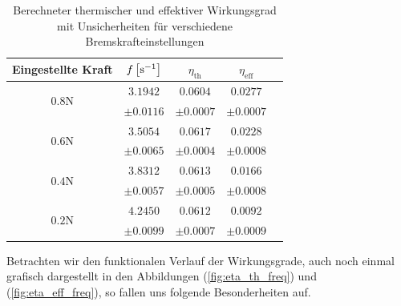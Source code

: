 \begin{table}[H]
  \centering
  \begin{tabular}{c c c c c}
  \toprule
  \textbf{Eingestellte Kraft} & \boldmath$f\,\qty[\si{\per\second}]$ & \boldmath$\eta_{\text{th}}$ & \boldmath$\eta_{\text{eff}}$ \\
  \midrule
  \multirow{2}{*}{\boldmath$0.8\si{\newton}$} & $3.1942$& $0.0604$ & $0.0277$ \\
   & $\pm 0.0116$ & $\pm 0.0007$ & $\pm 0.0007$ \\
  \midrule
  \multirow{2}{*}{\boldmath$0.6\si{\newton}$} & $3.5054$ & $0.0617$ & $0.0228$ \\
   & $\pm 0.0065$ & $\pm 0.0004$ & $\pm 0.0008$ \\
  \midrule
  \multirow{2}{*}{\boldmath$0.4\si{\newton}$} &  $3.8312$& $0.0613$ & $0.0166$ \\
   &  $\pm 0.0057$& $\pm 0.0005$ & $\pm 0.0008$ \\
  \midrule
  \multirow{2}{*}{\boldmath$0.2\si{\newton}$} &  $4.2450$& $0.0612$ & $0.0092$ \\
   &  $\pm 0.0099$ & $\pm 0.0007$ & $\pm 0.0009$ \\
  \bottomrule
  \end{tabular}
  \label{tab:werte_gebremst_kurz}
  \caption{Berechneter thermischer und effektiver Wirkungsgrad mit Unsicherheiten für verschiedene Bremskrafteinstellungen}
\end{table}
Betrachten wir den funktionalen Verlauf der Wirkungsgrade, auch noch einmal grafisch dargestellt in den Abbildungen (\ref{fig:eta_th_freq}) und (\ref{fig:eta_eff_freq}), so fallen uns folgende Besonderheiten auf.